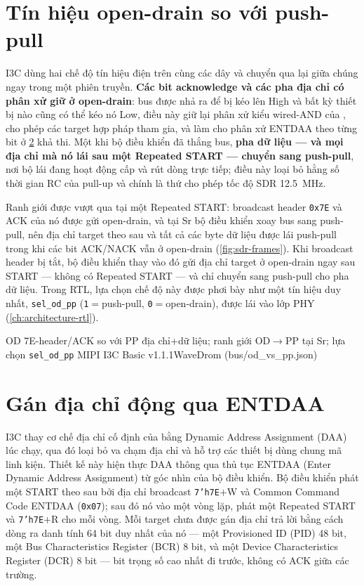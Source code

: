 \section{Tín hiệu open-drain so với push-pull}
\label{sec:bg-odpp}

I3C dùng hai chế độ tín hiệu điện trên cùng các dây và chuyển qua lại giữa chúng ngay trong một
phiên truyền. \textbf{Các bit acknowledge và các pha địa chỉ có phân xử giữ ở open-drain}: bus
được nhả ra để bị kéo lên High và bất kỳ thiết bị nào cũng có thể kéo nó Low, điều này giữ lại
phân xử kiểu wired-AND của \iic{}, cho phép các target \iic{} hợp pháp tham gia, và làm cho phân
xử ENTDAA theo từng bit ở \cref{sec:bg-entdaa} khả thi. Một khi bộ điều khiển đã thắng bus,
\textbf{pha dữ liệu --- và mọi địa chỉ mà nó lái sau một Repeated START --- chuyển sang
push-pull}, nơi bộ lái đang hoạt động cấp và rút dòng trực tiếp; điều này loại bỏ hằng số thời
gian RC của pull-up và chính là thứ cho phép tốc độ SDR \SI{12.5}{\mega\hertz}.

Ranh giới được vượt qua tại một Repeated START: broadcast header \texttt{0x7E} và ACK của nó
được gửi open-drain, và tại Sr bộ điều khiển xoay bus sang push-pull, nên địa chỉ target theo
sau và tất cả các byte dữ liệu được lái push-pull trong khi các bit ACK/NACK vẫn ở open-drain
(\cref{fig:sdr-frames}). Khi broadcast header bị tắt, bộ điều khiển thay vào đó gửi địa chỉ
target ở open-drain ngay sau START --- không có Repeated START --- và chỉ chuyển sang push-pull
cho pha dữ liệu. Trong RTL, lựa chọn chế độ này được phơi bày như một tín hiệu duy nhất,
\texttt{sel_od_pp} (\texttt{1}${=}$push-pull, \texttt{0}${=}$open-drain), được lái vào lớp PHY
(\cref{ch:architecture-rtl}).

  {OD 7E-header/ACK so với PP địa chỉ+dữ liệu; ranh giới OD$\rightarrow$PP tại Sr; lựa chọn \texttt{sel_od_pp}}
  {MIPI I3C Basic v1.1.1}{WaveDrom (bus/od_vs_pp.json)}

\section{Gán địa chỉ động qua ENTDAA}
\label{sec:bg-entdaa}

I3C thay cơ chế địa chỉ cố định của \iic{} bằng Dynamic Address Assignment (DAA) lúc chạy, qua
đó loại bỏ va chạm địa chỉ và hỗ trợ các thiết bị dùng chung mã linh kiện. Thiết kế này hiện
thực DAA thông qua thủ tục ENTDAA (Enter Dynamic Address Assignment) từ góc nhìn của bộ điều
khiển. Bộ điều khiển phát một START theo sau bởi địa chỉ broadcast \texttt{7'h7E}${+}$W và
Common Command Code ENTDAA (\texttt{0x07}); sau đó nó vào một vòng lặp, phát một Repeated START
và \texttt{7'h7E}${+}$R cho mỗi vòng. Mỗi target chưa được gán địa chỉ trả lời bằng cách dòng
ra danh tính 64 bit duy nhất của nó --- một Provisioned ID (PID) 48 bit, một Bus Characteristics
Register (BCR) 8 bit, và một Device Characteristics Register (DCR) 8 bit --- bit trọng số cao
nhất đi trước, không có ACK giữa các trường.

